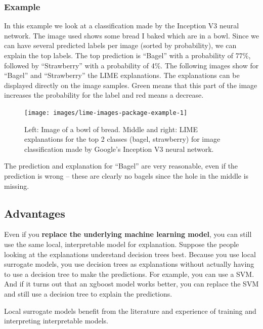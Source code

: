 \documentclass[
  10pt,
]{scrbook}
\begin{document}
\hypertarget{example-7}{%
\subsubsection{Example}\label{example-7}}

In this example we look at a classification made by the Inception V3 neural network.
The image used shows some bread I baked which are in a bowl.
Since we can have several predicted labels per image (sorted by probability), we can explain the top labels.
The top prediction is ``Bagel'' with a probability of 77\%, followed by ``Strawberry'' with a probability of 4\%.
The following images show for ``Bagel'' and ``Strawberry'' the LIME explanations.
The explanations can be displayed directly on the image samples.
Green means that this part of the image increases the probability for the label and red means a decrease.

\begin{figure}

{\centering \texttt{[image: images/lime-images-package-example-1]} 

}

\caption{Left: Image of a bowl of bread. Middle and right: LIME explanations for the top 2 classes (bagel, strawberry) for image classification made by Google's Inception V3 neural network.}\label{fig:lime-images-package-example-include}
\end{figure}

The prediction and explanation for ``Bagel'' are very reasonable, even if the prediction is wrong -- these are clearly no bagels since the hole in the middle is missing.

\hypertarget{advantages-13}{%
\subsection{Advantages}\label{advantages-13}}

Even if you \textbf{replace the underlying machine learning model}, you can still use the same local, interpretable model for explanation.
Suppose the people looking at the explanations understand decision trees best.
Because you use local surrogate models, you use decision trees as explanations without actually having to use a decision tree to make the predictions.
For example, you can use a SVM.
And if it turns out that an xgboost model works better, you can replace the SVM and still use a decision tree to explain the predictions.

Local surrogate models benefit from the literature and experience of training and interpreting interpretable models.
\end{document}
